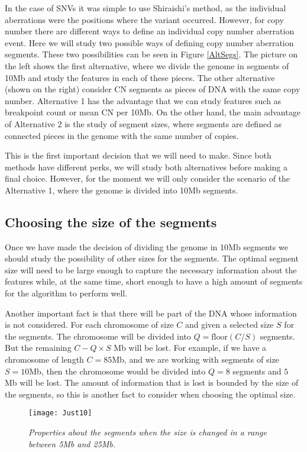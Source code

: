 \documentclass[a4paper]{article}
\begin{document}
In the case of SNVs it was simple to use Shiraishi's method, as the individual aberrations were the positions where the variant occurred. However, for copy number there are different ways to define an individual copy number aberration event. Here we will study two possible ways of defining copy number aberration segments. These two possibilities can be seen in Figure \ref{AltSegs}. The picture on the left shows the first alternative, where we divide the genome in segments of 10Mb and study the features in each of these pieces. The other alternative (shown on the right) consider CN segments as pieces of DNA with the same copy number. Alternative 1 has the advantage that we can study features such as breakpoint count or mean CN per 10Mb. On the other hand, the main advantage of Alternative 2 is the study of segment sizes, where segments are defined as connected pieces in the genome with the same number of copies.

This is the first important decision that we will need to make. Since both methods have different perks, we will study both alternatives before making a final choice. However, for the moment we will only consider the scenario of the Alternative 1, where the genome is divided into 10Mb segments.

\subsection{Choosing the size of the segments}
Once we have made the decision of dividing the genome in 10Mb segments we should study the possibility of other sizes for the segments. The optimal segment size will need to be large enough to capture the necessary information about the features while, at the same time, short enough to have a high amount of segments for the algorithm to perform well. 

Another important fact is that there will be part of the DNA whose information is not considered. For each chromosome of size $C$ and given a selected size $S$ for the segments. The chromosome will be divided into $Q=\text{floor}(C/S)$ segments. But the remaining $C-Q\times S$ Mb will be lost. For example, if we have a chromosome of length $C=85$Mb, and we are working with segments of size $S=10$Mb, then the chromosome would be divided into $Q=8$ segments and $5$ Mb will be lost. The amount of information that is lost is bounded by the size of the segments, so this is another fact to consider when choosing the optimal size. 

\begin{figure}[h] 
	\centering
	\texttt{[image: Just10]} 
	\caption{\textit{Properties about the segments when the size is changed in a range between 5Mb and 25Mb.}} \label{Just10}
\end{figure}
\end{document}
